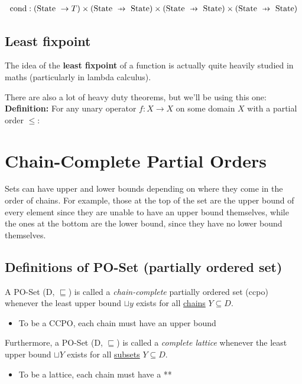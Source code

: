 \documentclass[11pt,a4paper,titlepage,dvipsnames,cmyk]{scrartcl}
\newcommand\pfun{\mathrel{\ooalign{\hfil$\mapstochar\mkern5mu$\hfil\cr$\to$\cr}}}
\begin{document}
\begin{align*}
    \text{cond} : (\text{State } \rightarrow T) \times (\text{State }
    \pfun \text{ State}) \times (\text{State }
    \pfun \text{ State})\times (\text{State }
    \pfun \text{ State})
\end{align*}

\subsection{Least fixpoint}%
\label{sub:least-fixpoint}
The idea of the \textbf{least fixpoint} of a function is actually quite
heavily studied in maths (particularly in lambda calculus).

There are also a lot of heavy duty theorems, but we'll be using this one:
\textbf{Definition:} For any unary operator $f : X \rightarrow X$ on some
domain $X$ with a partial order $\le:$

\section{Chain-Complete Partial Orders}%
\label{sec:ccpo}

Sets can have upper and lower bounds depending on where they come in the
order of chains. For example, those at the top of the set are the upper
bound of every element since they are unable to have an upper bound
themselves, while the ones at the bottom are the lower bound, since they
have no lower bound themselves.

\subsection{Definitions of PO-Set (partially ordered set)}%
\label{sub:Definitions of PO-Set}
A PO-Set (D, $\sqsubseteq$) is called a \textit{chain-complete} partially
ordered set (ccpo) whenever the least upper bound $\sqcup y$ exists for
all \underline{chains} $Y \subseteq D$.
\begin{itemize}
    \item To be a CCPO, each chain must have an upper bound
\end{itemize}

Furthermore, a PO-Set (D, $\sqsubseteq$) is called a \textit{complete
lattice} whenever the least upper bound $\sqcup Y$ exists for all
\underline{subsets} $Y\subseteq D$.
\begin{itemize}
    \item To be a lattice, each chain must have a ** %
\end{itemize}
\end{document}
